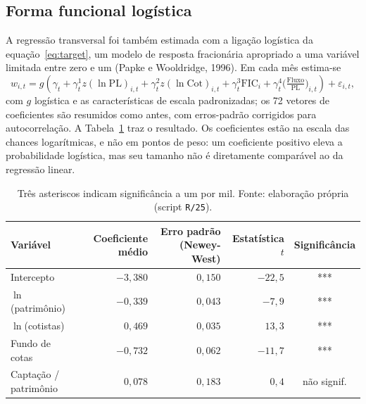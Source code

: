 \documentclass[12pt,a4paper]{article}
\begin{document}
\subsection{Forma funcional logística}

A regressão transversal foi também estimada com a ligação logística da equação~\eqref{eq:target},
um modelo de resposta fracionária apropriado a uma variável limitada entre zero e um (Papke e
Wooldridge, 1996). Em cada mês estima-se
\begin{equation}
w_{i,t} = g\!\left(\gamma_t + \gamma^{1}_t z(\ln\text{PL})_{i,t} + \gamma^{2}_t z(\ln\text{Cot})_{i,t}
        + \gamma^{3}_t \text{FIC}_i + \gamma^{4}_t \big(\tfrac{\text{Fluxo}}{\text{PL}}\big)_{i,t}\right)
        + \varepsilon_{i,t},
\label{eq:logitcs}
\end{equation}
com $g$ logística e as características de escala padronizadas; os 72 vetores de coeficientes são
resumidos como antes, com erros-padrão corrigidos para autocorrelação. A Tabela~\ref{tab:logit}
traz o resultado. Os coeficientes estão na escala das chances logarítmicas, e não em pontos de
peso: um coeficiente positivo eleva a probabilidade logística, mas seu tamanho não é diretamente
comparável ao da regressão linear.

\begin{table}[h]\centering\small
\caption{Regressão transversal logística (resposta fracionária), resumo Fama--MacBeth com
erros-padrão Newey-West. Coeficientes na escala das chances logarítmicas.}
\label{tab:logit}
\begin{tabular}{@{}lrrrc@{}}
\toprule
Variável & Coeficiente médio & Erro padrão (Newey-West) & Estatística $t$ & Significância \\
\midrule
Intercepto              & $-3{,}380$ & $0{,}150$ & $-22{,}5$ & *** \\
$\ln$(patrimônio)       & $-0{,}339$ & $0{,}043$ & $-7{,}9$  & *** \\
$\ln$(cotistas)         & $0{,}469$  & $0{,}035$ & $13{,}3$  & *** \\
Fundo de cotas          & $-0{,}732$ & $0{,}062$ & $-11{,}7$ & *** \\
Captação / patrimônio   & $0{,}078$  & $0{,}183$ & $0{,}4$   & não signif. \\
\bottomrule
\end{tabular}
\caption*{\footnotesize Três asteriscos indicam significância a um por mil. Fonte: elaboração
própria (script \texttt{R/25}).}
\end{table}
\end{document}
